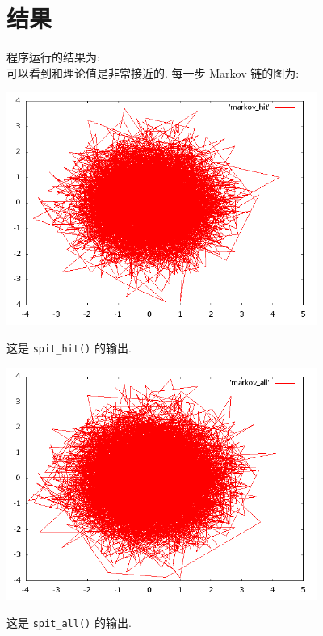 \documentclass{ctexart}
\begin{document}
\section{结果}
程序运行的结果为:
\[

\]
\[

\]
\[

\]
可以看到和理论值是非常接近的.
每一步 Markov 链的图为:
\begin{center}
\includegraphics[width=4in]{markov_hit.png}
\end{center}
这是 \verb|spit_hit()| 的输出.
\begin{center}
\includegraphics[width=4in]{markov_all.png}
\end{center}
这是 \verb|spit_all()| 的输出.
\end{document}
